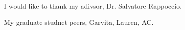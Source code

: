 
I would like to thank my adivsor, Dr. Salvatore Rappoccio.

My graduate studnet peers, Garvita, Lauren, AC.
